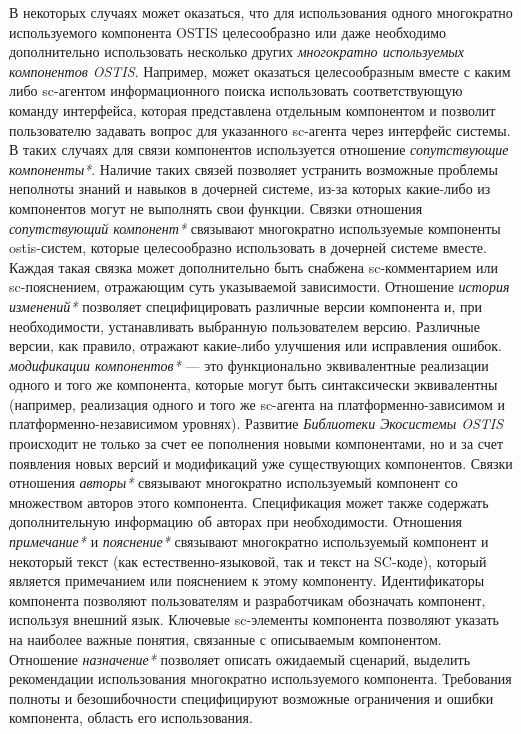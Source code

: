 В некоторых случаях может оказаться, что для использования одного многократно используемого компонента OSTIS целесообразно или даже необходимо дополнительно использовать несколько других \textit{многократно используемых компонентов OSTIS}. Например, может оказаться целесообразным вместе с каким либо sc-агентом информационного поиска использовать соответствующую команду интерфейса, которая представлена отдельным компонентом и позволит пользователю задавать вопрос для указанного sc-агента через интерфейс системы. В таких случаях для связи компонентов используется отношение \textit{сопутствующие компоненты*}. Наличие таких связей позволяет устранить возможные проблемы неполноты знаний и навыков в дочерней системе, из-за которых какие-либо из компонентов могут не выполнять свои функции. Связки отношения \textit{сопутствующий компонент*} связывают многократно используемые компоненты ostis-систем, которые целесообразно использовать в дочерней системе вместе. Каждая такая связка может дополнительно быть снабжена sc-комментарием или sc-пояснением, отражающим суть указываемой зависимости. Отношение \textit{история изменений*} позволяет специфицировать различные версии компонента и, при необходимости, устанавливать выбранную пользователем версию. Различные версии, как правило, отражают какие-либо улучшения или исправления ошибок. \textit{модификации компонентов*} --- это функционально эквивалентные реализации одного и того же компонента, которые могут быть синтаксически эквивалентны (например, реализация одного и того же sc-агента на платформенно-зависимом и платформенно-независимом уровнях). Развитие \textit{Библиотеки Экосистемы OSTIS} происходит не только за счет ее пополнения новыми компонентами, но и за счет появления новых версий и модификаций уже существующих компонентов. Связки отношения \textit{авторы*} связывают многократно используемый компонент со множеством авторов этого компонента. Спецификация может также содержать дополнительную информацию об авторах при необходимости. Отношения \textit{примечание*} и \textit{пояснение*} связывают многократно используемый компонент и некоторый текст (как естественно-языковой, так и текст на SC-коде), который является примечанием или пояснением к этому компоненту. Идентификаторы компонента позволяют пользователям и разработчикам обозначать компонент, используя внешний язык. Ключевые sc-элементы компонента позволяют указать на наиболее важные понятия, связанные с описываемым компонентом. Отношение \textit{назначение*} позволяет описать ожидаемый сценарий, выделить рекомендации использования многократно используемого компонента. Требования полноты и безошибочности специфицируют возможные ограничения и ошибки компонента, область его использования.

